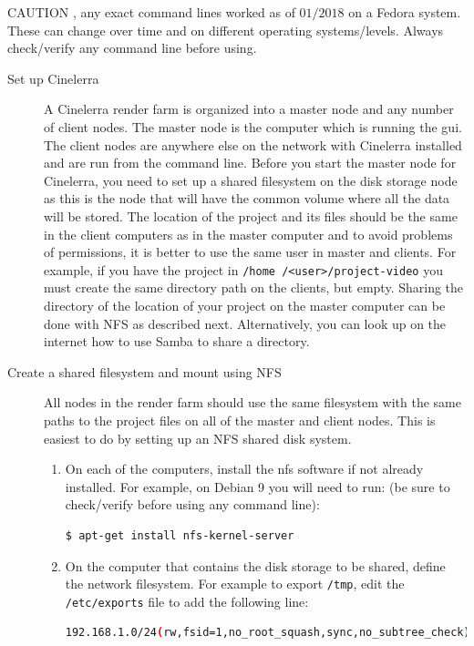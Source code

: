 {\color{red} CAUTION }, any exact command lines worked as of $01/2018$ on a Fedora system.  These can change over time and on different operating systems/levels.  Always check/verify any command line before using.

\begin{description}
    \item[Set up Cinelerra] A Cinelerra render farm is organized into a master node and any number of client nodes.  The master node is the computer which is running the gui.  The client nodes are anywhere else on the network with Cinelerra installed and are run from the command line.  Before you start the master node for Cinelerra, you need to set up a shared filesystem on the disk storage node as this is the node that will have the common volume where all the data will be stored.  
    The location of the project and its files should be the same in the client computers as in the master computer and to avoid problems of permissions, it is better to use the same user in master and clients. 
    For example, if you have the project in \texttt{/home /<user>/project-video} you must create the same directory path on the clients, but empty.  Sharing the directory of the location of your project on the master computer can be done with NFS as described next.  Alternatively, you can look up on the internet how to use Samba to share a directory.
    \item[Create a shared filesystem and mount using NFS] All nodes in the render farm should use the same filesystem with the same paths to the project files on all of the master and client nodes.  This is easiest to do by setting up an NFS shared disk system.
    \begin{enumerate}
        \item On each of the computers, install the nfs software if not already installed.  For example, on Debian 9
        you will need to run: (be sure to check/verify before using any command line):
        \begin{lstlisting}[language=bash,numbers=none]
$ apt-get install nfs-kernel-server
        \end{lstlisting}
        \item On the computer that contains the disk storage to be shared, define the network filesystem.  For
        example to export \texttt{/tmp}, edit the \texttt{/etc/exports} file to add the following line:
        \begin{lstlisting}[language=bash,numbers=none]
192.168.1.0/24(rw,fsid=1,no_root_squash,sync,no_subtree_check)

\end{lstlisting}
\end{enumerate}
\end{description}

